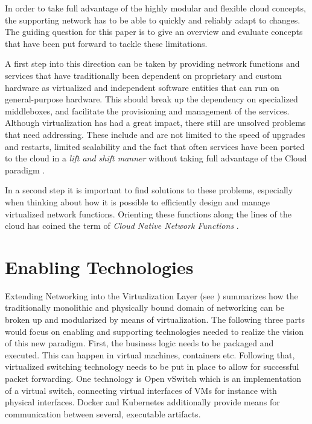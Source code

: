 In order to take full advantage of the highly modular and flexible cloud concepts, the supporting network has to be able to quickly and reliably adapt to changes. The guiding question for this paper is to give an overview and evaluate concepts that have been put forward to tackle these limitations. 

A first step into this direction can be taken by providing network functions  and services that have traditionally been dependent on proprietary and custom hardware as virtualized and independent software entities that can run on general-purpose hardware. This should break up the dependency on specialized middleboxes, and facilitate the provisioning and management of the services. Although virtualization has had a great impact, there still are unsolved problems that need addressing. These include and are not limited to the speed of upgrades and restarts, limited scalability and the fact that often services have been ported to the cloud in a \textit{lift and shift manner} without taking full advantage of the Cloud paradigm \cite{CNF}.

In a second step it is important to find solutions to these problems, especially when thinking about how it is possible to efficiently design and manage virtualized network functions. Orienting these functions along the lines of the cloud has coined the term of \textit{Cloud Native Network Functions} \cite{CNF} \cite{inproceedings} \cite{evolutionnfv}.  


\section{Enabling Technologies}
Extending Networking into the Virtualization Layer (see \cite{pfaff2009extending}) summarizes how the traditionally monolithic and physically bound domain of networking can be broken up and modularized by means of virtualization. The following three parts would focus on enabling and supporting technologies needed to realize the vision of this new paradigm. First, the business logic needs to be packaged and executed. This can happen in virtual machines, containers etc. Following that, virtualized switching technology needs to be put in place to allow for successful packet forwarding. One technology is Open vSwitch which is an implementation of a virtual switch, connecting virtual interfaces of VMs for instance with physical interfaces. Docker and Kubernetes additionally provide means for communication between several, executable artifacts.
